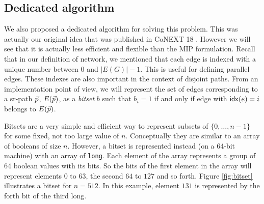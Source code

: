 \subsection{Dedicated algorithm}

We also proposed a dedicated algorithm for solving this problem. This was actually our original idea that was published in CoNEXT 18 \cite{rdp}.
However we will see that it is actually less efficient and flexible than the MIP formulation.
Recall that in our definition of network, we mentioned that each edge is indexed with a unique number between $0$ and $|E(G)| - 1$. This is useful for
defining parallel edges. These indexes are also important in the context of disjoint paths. From an implementation point of view, we will represent the
set of edges corresponding to a sr-path $\vec{p}$, $E(\vec{p})$, as a \emph{bitset} $b$ such that $b_i = 1$ if and only if edge with $\mathsf{idx}(e) = i$ belongs
to $E(\vec{p})$.

Bitsets are a very simple and efficient way to represent subsets of $\{ 0, \ldots, n - 1 \}$ for some fixed, not too large value of $n$. Conceptually they
are similar to an array of booleans of size $n$. However, a bitset is represented instead (on a 64-bit machine) with an array of \texttt{long}. Each element of the array
represents a group of $64$ boolean values with its bits. So the bits of the first element in the array will represent elements $0$ to $63$, the second $64$ to $127$ and 
so forth. Figure \ref{fig:bitset} illustrates a bitset for $n = 512$. In this example, element $131$ is represented by the forth bit of
the third long.

